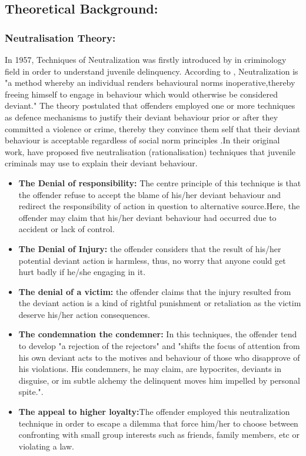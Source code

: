 \subsection{Theoretical Background:}
\subsubsection{Neutralisation Theory:}
In 1957, Techniques of Neutralization was firstly introduced by \citet{Sykes1957} in criminology field in order to understand juvenile delinquency. According to \cite{Buffalo}, Neutralization is "a method whereby an individual renders behavioural norms inoperative,thereby freeing himself to engage in behaviour which would otherwise be considered deviant." The theory postulated that offenders employed one or more techniques as defence mechanisms to justify their deviant behaviour prior or after they committed a violence or crime, thereby they convince them self that their deviant behaviour is acceptable regardless of social norm principles \cite{Teh2015}.In their original work, \citet{Sykes1957}have proposed five neutralisation (rationalisation) techniques that juvenile criminals may use to explain their deviant behaviour.  
\begin{itemize}
\item \textbf{The Denial of responsibility:} The centre principle of this technique is that the offender refuse to accept the blame of his/her deviant behaviour and redirect the responsibility of action in question to alternative source.Here, the offender may claim that his/her deviant behaviour had occurred due to accident or lack of control\cite{Sykes1957}.   
\item \textbf{The Denial of Injury:} the offender considers that the result of his/her potential deviant action is harmless, thus, no worry that anyone could get hurt badly if he/she engaging in it\cite{Sykes1957}. 
\item \textbf{The denial of a victim:} the offender claims that the injury resulted from the deviant action is a kind of rightful punishment or retaliation as the victim deserve his/her action consequences\cite{Sykes1957}.   
\item \textbf{The condemnation the condemner:} In this techniques, the offender tend to develop "a rejection of the rejectors" and "shifts the focus of attention from his own deviant acts to the motives and behaviour of those who disapprove of his violations. His condemners, he may claim, are hypocrites, deviants in disguise, or im subtle alchemy the delinquent moves him impelled by personal spite."\cite{Sykes1957}.
\item \textbf{The appeal to higher loyalty:}The offender employed this neutralization technique in order to escape a dilemma that force him/her to choose between confronting with small group interests such as friends, family members, etc or violating a law\cite{Sykes1957}.    
\end{itemize}
